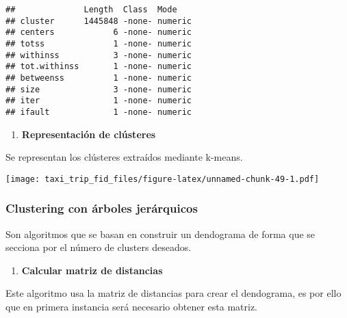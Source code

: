 \documentclass[
]{article}
\newenvironment{Shaded}{\begin{snugshade}}{\end{snugshade}}
\newcommand{\AttributeTok}[1]{\textcolor[rgb]{0.77,0.63,0.00}{#1}}
\newcommand{\CommentTok}[1]{\textcolor[rgb]{0.56,0.35,0.01}{\textit{#1}}}
\newcommand{\FunctionTok}[1]{\textcolor[rgb]{0.00,0.00,0.00}{#1}}
\newcommand{\NormalTok}[1]{#1}
\newcommand{\SpecialCharTok}[1]{\textcolor[rgb]{0.00,0.00,0.00}{#1}}
\providecommand{\tightlist}{%
  \setlength{\itemsep}{0pt}\setlength{\parskip}{0pt}}
\begin{document}
\begin{verbatim}
##              Length  Class  Mode   
## cluster      1445848 -none- numeric
## centers            6 -none- numeric
## totss              1 -none- numeric
## withinss           3 -none- numeric
## tot.withinss       1 -none- numeric
## betweenss          1 -none- numeric
## size               3 -none- numeric
## iter               1 -none- numeric
## ifault             1 -none- numeric
\end{verbatim}

\begin{enumerate}
\def\labelenumi{\arabic{enumi}.}
\setcounter{enumi}{2}
\tightlist
\item
  \textbf{Representación de clústeres}
\end{enumerate}

Se representan los clústeres extraídos mediante k-means.

\begin{Shaded}
\end{Shaded}

\texttt{[image: taxi\_trip\_fid\_files/figure-latex/unnamed-chunk-49-1.pdf]}

\hypertarget{clustering-con-uxe1rboles-jeruxe1rquicos}{%
\subsubsection{Clustering con árboles
jerárquicos}\label{clustering-con-uxe1rboles-jeruxe1rquicos}}

Son algoritmos que se basan en construir un dendograma de forma que se
secciona por el número de clusters deseados.

\begin{enumerate}
\def\labelenumi{\arabic{enumi}.}
\tightlist
\item
  \textbf{Calcular matriz de distancias}
\end{enumerate}

Este algoritmo usa la matriz de distancias para crear el dendograma, es
por ello que en primera instancia será necesario obtener esta matriz.
\end{document}

